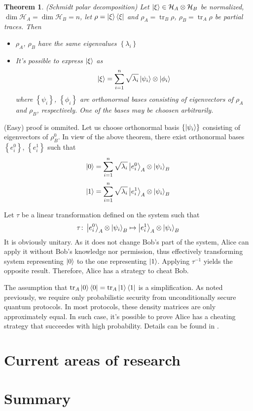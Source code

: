 \documentclass[10pt]{article}
\newtheorem{theorem}{Theorem}
\begin{document}
\begin{theorem}(Schmidt polar decomposition) 
Let \(\Ket{\xi}\in\mathcal{H}_A\otimes\mathcal{H}_B\) be normalized, 
\(\dim \mathcal{H}_A=\dim\mathcal{H}_B=n\), let  \(\rho=\Ket{\xi}\Bra{\xi}\)
and \(\rho_A=\operatorname{tr}_B\rho\), \(\rho_B=\operatorname{tr}_A\rho\) be partial traces. Then
\begin{itemize}
  \item \(\rho_A\), \(\rho_B\) have the same eigenvalues \(\left\{\lambda_i\right\}\)
  \item It's possible to express \(\Ket{\xi}\) as 
\[
    \Ket{\xi}=\sum_{i=1}^n\sqrt{\lambda_i}\Ket{\psi_i}\otimes\Ket{\phi_i}
\]
    where \(\left\{\psi_i\right\}\), \(\left\{\phi_i\right\}\) are orthonormal bases consisting of
    eigenvectors of \(\rho_A\) and \(\rho_B\), respectively. One of the bases may be choosen
    arbitrarily.
\end{itemize}
\end{theorem}

\vspace{3mm}

(Easy) proof is ommited. Let us choose orthonormal basis \(\left\{\Ket{\psi_i}\right\}\)
consisting of eigenvectors of \(\rho_B^0\). In view of the above theorem, there exist orthonormal
bases \(\left\{e_i^0\right\}\), \(\left\{e_i^1\right\}\) such that
\[
\Ket{0}=\sum_{i=1}^n\sqrt{\lambda_i}\Ket{e_i^0}_A\otimes\Ket{\psi_i}_B
\]
\[
\Ket{1}=\sum_{i=1}^n\sqrt{\lambda_i}\Ket{e_i^1}_A\otimes\Ket{\psi_i}_B
\]

Let \(\tau\) be a linear transformation defined on the system such that 
\[
\tau\colon\Ket{e_i^0}_A\otimes\Ket{\psi_i}_B \mapsto\Ket{e_i^1}_A\otimes\Ket{\psi_i}_B
\]
It is obviously unitary. As it does not change Bob's part of the system, Alice can apply it 
without Bob's knowledge nor permission, thus effectively transforming system representing \(\Ket{0}\)
to the one representing \(\Ket{1}\). Applying \(\tau^{-1}\) yields the opposite result. Therefore, 
Alice has a strategy to cheat Bob.

The assumption that \(\operatorname{tr}_A \Ket{0}\Bra{0} = \operatorname{tr}_A \Ket{1}\Bra{1}\)
is a simplification. As noted previously, we require only probabilistic security from unconditionally
secure quantum protocols. In most protocols, these density matrices are only approximately equal.
In such case, it's possible to prove Alice has a cheating strategy that succeedes with high 
probability. Details can be found in \cite{Lo96}.

\section{Current areas of research}

\section{Summary}

\nocite{*}



\end{document}
